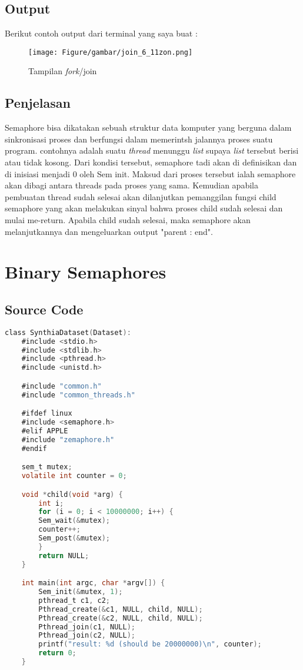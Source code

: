 \documentclass[11pt,a4paper]{article}
\begin{document}
\subsection{\textbf{Output}}
    Berikut contoh output dari terminal yang saya buat :
    
\begin{figure}[h]
    \centering
    \texttt{[image: Figure/gambar/join\_6\_11zon.png]}
    \caption{Tampilan \textit{fork}/join }
    \label{fig:join}
\end{figure}

\subsection{\textbf{Penjelasan}}
    Semaphore bisa dikatakan sebuah struktur data komputer yang berguna dalam sinkronisasi proses dan berfungsi dalam memerintsh jalannya proses suatu program. contohnya adalah suatu \textit{thread} menunggu \textit{list} supaya \textit{list} tersebut berisi atau tidak kosong. Dari kondisi tersebut, semaphore tadi akan di definisikan dan di inisiasi menjadi 0 oleh Sem init. Maksud dari proses tersebut ialah semaphore akan dibagi antara threads pada proses yang sama. Kemudian apabila pembuatan thread sudah selesai akan dilanjutkan pemanggilan fungsi child semaphore yang akan melakukan sinyal bahwa proses child sudah selesai dan mulai me-return. Apabila child sudah selesai, maka semaphore akan melanjutkannya dan mengeluarkan output "parent : end".
    
    
    
\section{\textbf{Binary Semaphores}}
\subsection{Source Code }
    \begin{lstlisting}[language=C,label={labelkode}]
    class SynthiaDataset(Dataset):
    #include <stdio.h>
    #include <stdlib.h>
    #include <pthread.h>
    #include <unistd.h>

    #include "common.h"
    #include "common_threads.h"

    #ifdef linux
    #include <semaphore.h>
    #elif APPLE
    #include "zemaphore.h"
    #endif

    sem_t mutex;
    volatile int counter = 0;

    void *child(void *arg) {
        int i;
        for (i = 0; i < 10000000; i++) {
	    Sem_wait(&mutex);
	    counter++;
	    Sem_post(&mutex);
        }
        return NULL;
    }

    int main(int argc, char *argv[]) {
        Sem_init(&mutex, 1); 
        pthread_t c1, c2;
        Pthread_create(&c1, NULL, child, NULL);
        Pthread_create(&c2, NULL, child, NULL);
        Pthread_join(c1, NULL);
        Pthread_join(c2, NULL);
        printf("result: %d (should be 20000000)\n", counter);
        return 0;
    }
    \end{lstlisting}
\end{document}

